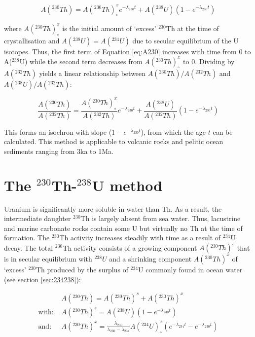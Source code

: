 \documentclass{book}
\begin{document}
\begin{equation}
A(^{230}Th) = A(^{230}Th)_\circ^x e^{-\lambda_{230}t} + A(^{238}U)(1-e^{-\lambda_{230}t})
\label{eq:A230}
\end{equation}

where $A(^{230}Th)_\circ^x$ is the initial amount of `excess'
$^{230}$Th at the time of crystallisation and $A(^{238}U)=A(^{234}U)$
due to secular equilibrium of the U isotopes. Thus, the first term of
Equation \ref{eq:A230} increases with time from 0 to A($^{238}$U)
while the second term decreases from $A(^{230}Th)_\circ^x$ to
0. Dividing by $A(^{232}Th)$ yields a linear relationship between
$A(^{230}Th)/A(^{232}Th)$ and $A(^{238}U) / A(^{232}Th)$:

\begin{equation}
\frac{A(^{230}Th)}{A(^{232}Th)} = \frac{A(^{230}Th)_\circ^x}{A(^{232}Th)} e^{-\lambda_{230}t} + 
\frac{A(^{238}U)}{A(^{232}Th)}(1-e^{-\lambda_{230}t})
\label{eq:230232}
\end{equation}

This forms an isochron with slope ($1-e^{-\lambda_{230}t}$), from
which the age $t$ can be calculated. This method is applicable to
volcanic rocks and pelitic ocean sediments ranging from 3ka to 1Ma.

\section{The $^{230}$Th-$^{238}$U method}
\label{sec:230238}

Uranium is significantly more soluble in water than Th. As a result,
the intermediate daughter $^{230}$Th is largely absent from sea
water. Thus, lacustrine and marine carbonate rocks contain some U but
virtually no Th at the time of formation. The $^{230}$Th activity
increases steadily with time as a result of $^{234}$U decay. The total
$^{230}$Th activity consists of a growing component $A(^{230}Th)^s$
that is in secular equilibrium with $^{238}U$ and a shrinking
component $A(^{230}Th)^x$ of `excess' $^{230}$Th produced by the
surplus of $^{234}$U commonly found in ocean water (see section
\ref{sec:234238}):

\begin{align}
~ & A(^{230}Th) =  A(^{230}Th)^s + A(^{230}Th)^x \label{eq:230total}\\
\mbox{with:~} & A(^{230}Th)^s = A(^{238}U) (1-e^{-\lambda_{230}t}) \label{eq:230s}\\
\mbox{and:~} & A(^{230}Th)^x = \frac{\lambda_{230}}{\lambda_{230}-\lambda_{234}} 
A(^{234}U)_\circ^x\left(e^{-\lambda_{234}t}-e^{-\lambda_{230}t}\right) \label{eq:230x}
\end{align}
\end{document}
